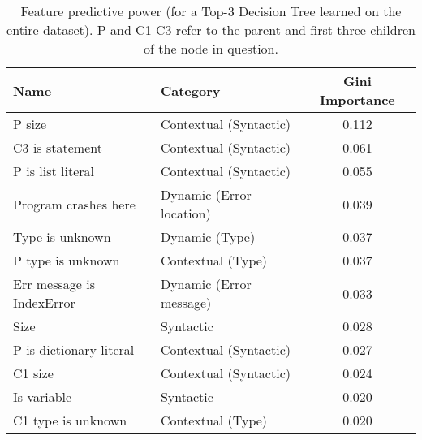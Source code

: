 \documentclass[conference]{IEEEtran}
\begin{document}
\begin{table}[]
\begin{tabular}{llc}
Name                      & Category                & Gini Importance \\ \bottomrule
P size                    & Contextual (Syntactic)  & 0.112 \\
C3 is statement           & Contextual (Syntactic)  & 0.061 \\
P is list literal         & Contextual (Syntactic)  & 0.055 \\
Program crashes here      & Dynamic (Error location)& 0.039 \\
Type is unknown           & Dynamic (Type)          & 0.037 \\
P type is unknown         & Contextual (Type)       & 0.037 \\
Err message is IndexError & Dynamic (Error message) & 0.033 \\
Size                      & Syntactic               & 0.028 \\
P is dictionary literal   & Contextual (Syntactic)  & 0.027 \\
C1 size                   & Contextual (Syntactic)  & 0.024 \\
Is variable               & Syntactic               & 0.020 \\
C1 type is unknown        & Contextual (Type)       & 0.020 \\
\toprule
\end{tabular}
\caption{Feature predictive power (for a Top-3 Decision Tree
learned on the entire dataset). P and C1-C3 refer to the parent and
first three children of the node in question.}
\label{tab-feature-predictive-power}
\end{table}
\end{document}
